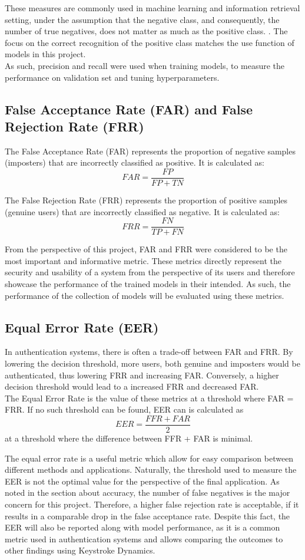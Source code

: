 These measures are commonly used in machine learning and information retrieval setting, under the assumption that the negative class, and consequently, the number of true negatives, does not matter as much as the positive class. . The focus on the correct recognition of the positive class matches the use function of models in this project.\\
As such, precision and recall were used when training models, to measure the performance on validation set and tuning hyperparameters.

\subsection{False Acceptance Rate (FAR) and False Rejection Rate (FRR)}
The False Acceptance Rate (FAR) represents the proportion of negative samples (imposters) that are incorrectly classified as positive. It is calculated as:
\[
FAR = \frac{FP}{FP + TN}
\]

The False Rejection Rate (FRR) represents the proportion of positive samples (genuine users) that are incorrectly classified as negative. It is calculated as:
\[
FRR = \frac{FN}{TP + FN}
\]

From the perspective of this project, FAR and FRR were considered to be the most important and informative metric. These metrics directly represent the security and usability of a system from the perspective of its users and therefore showcase the performance of the trained models in their intended. As such, the performance of the collection of models will be evaluated using these metrics. 

\subsection{Equal Error Rate (EER)}
In authentication systems, there is often a trade-off between FAR and FRR. By lowering the decision threshold, more users, both genuine and imposters would be authenticated, thus lowering FRR and increasing FAR. Conversely, a higher decision threshold would lead to a increased FRR and decreased FAR. \\
The Equal Error Rate is the value of these metrics at a threshold where FAR = FRR. If no such threshold can be found, EER can is calculated as  
\[
EER = \frac{FFR + FAR}{2}
\]
at a threshold where the difference between FFR + FAR is minimal.

The equal error rate is a useful metric which allow for easy comparison between different methods and applications. Naturally, the threshold used to measure the EER is not the optimal value for the perspective of the final application. As noted in the section about accuracy, the number of false negatives is the major concern for this project. Therefore, a higher false rejection rate is acceptable, if it results in a comparable drop in the false acceptance rate. Despite this fact, the EER will also be reported along with model performance, as it is a common metric used in authentication systems and allows comparing the outcomes to other findings using Keystroke Dynamics.
